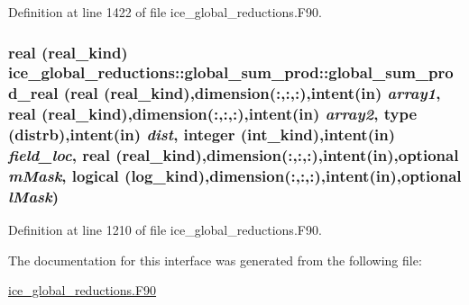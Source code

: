 Definition at line 1422 of file ice\_\-global\_\-reductions.F90.\hypertarget{interfaceice__global__reductions_1_1global__sum__prod_a3edc1bbd476b4ace75b3bbe1d6233629}{
\subsubsection[{global\_\-sum\_\-prod\_\-real}]{\setlength{\rightskip}{0pt plus 5cm}real (real\_\-kind) ice\_\-global\_\-reductions::global\_\-sum\_\-prod::global\_\-sum\_\-prod\_\-real (real (real\_\-kind),dimension(:,:,:),intent(in) {\em array1}, \/  real (real\_\-kind),dimension(:,:,:),intent(in) {\em array2}, \/  type ({\bf distrb}),intent(in) {\em dist}, \/  integer (int\_\-kind),intent(in) {\em field\_\-loc}, \/  real (real\_\-kind),dimension(:,:,:),intent(in),optional {\em mMask}, \/  logical (log\_\-kind),dimension(:,:,:),intent(in),optional {\em lMask})}}
\label{interfaceice__global__reductions_1_1global__sum__prod_a3edc1bbd476b4ace75b3bbe1d6233629}


Definition at line 1210 of file ice\_\-global\_\-reductions.F90.

The documentation for this interface was generated from the following file:\begin{DoxyCompactItemize}
\item 
\hyperlink{ice__global__reductions_8F90}{ice\_\-global\_\-reductions.F90}\end{DoxyCompactItemize}
